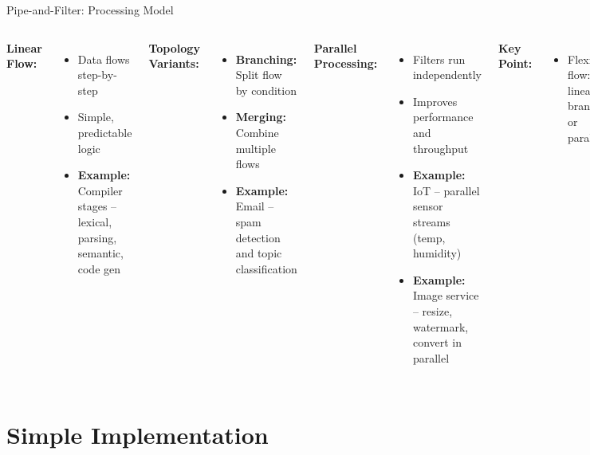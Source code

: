 \documentclass[aspectratio=169, table]{beamer}
\begin{document}
\begin{frame}[fragile]{Pipe-and-Filter: Processing Model}
	\vspace{20pt}
	\begin{columns}[T]
		\textbf{Linear Flow:}
		\begin{itemize}
			\item Data flows step-by-step
			\item Simple, predictable logic
			\item \textbf{Example:} Compiler stages – lexical, parsing, semantic, code gen
		\end{itemize}
		
		\textbf{Topology Variants:}
		\begin{itemize}
			\item \textbf{Branching:} Split flow by condition
			\item \textbf{Merging:} Combine multiple flows
			\item \textbf{Example:} Email – spam detection and topic classification
		\end{itemize}
		
		\textbf{Parallel Processing:}
		\begin{itemize}
			\item Filters run independently
			\item Improves performance and throughput
			\item \textbf{Example:} IoT – parallel sensor streams (temp, humidity)
			\item \textbf{Example:} Image service – resize, watermark, convert in parallel
		\end{itemize}
		
		\textbf{Key Point:}
		\begin{itemize}
			\item Flexible flow: linear, branched, or parallel
		\end{itemize}
	\end{columns}
\end{frame}

\section{Simple Implementation}
\end{document}
